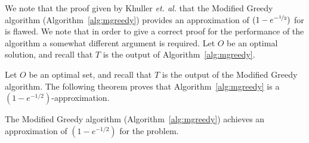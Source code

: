 We note that the proof given by Khuller {\em et. al.} \cite{khuller1999budgeted} that the Modified Greedy algorithm (Algorithm~\ref{alg:mgreedy}) provides an approximation of $ (1-e^{-\nicefrac[]{1}{2}})$ for \SK is flawed.
{}
We note that in order to give a correct proof for the performance of the algorithm a somewhat different argument is required.
Let $O$ be an optimal solution, and recall that $T$ is the output of Algorithm~\ref{alg:mgreedy}.


Let $O$ be an optimal set, and recall that $T$ is the output of the Modified Greedy algorithm.
The following theorem proves that Algorithm~\ref{alg:mgreedy} is a $(1-e^{-1/2})$-approximation.

\begin{theorem}
	\label{theorem:mgreedy}
	The Modified Greedy algorithm (Algorithm~\ref{alg:mgreedy}) achieves an approximation of $(1 - e^{-1/2})$ for the \SK problem.
\end{theorem}

